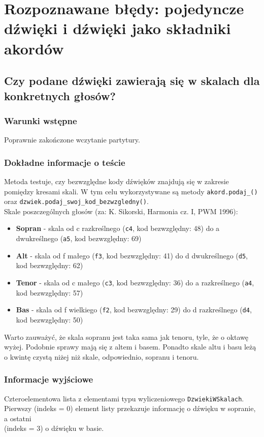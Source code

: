 \documentclass[dokumentacja.tex]{subfiles}
\begin{document}
\section{Rozpoznawane błędy: pojedyncze dźwięki i dźwięki jako składniki akordów}

\subsection{Czy podane dźwięki zawierają się w skalach dla konkretnych głosów?}
\subsubsection{Warunki wstępne}
Poprawnie zakończone wczytanie partytury.
\subsubsection{Dokładne informacje o teście}
Metoda testuje, czy bezwzględne kody dźwięków znajdują się w zakresie pomiędzy kresami skali. W tym celu wykorzystywane są metody \texttt{akord.podaj\_<żądany głos>()} oraz \texttt{dzwiek.podaj\_swoj\_kod\_bezwzgledny()}. \\ Skale poszczególnych głosów (za: K. Sikorski, Harmonia cz. I, PWM 1996):
\begin{itemize}
    \item \textbf{Sopran} - skala od c razkreślnego (\texttt{c4}, kod bezwzględny: 48) do a dwukreślnego (\texttt{a5}, kod bezwzględny: 69)
    \item \textbf{Alt} - skala od f małego (\texttt{f3}, kod bezwzględny: 41) do d dwukreślnego (\texttt{d5}, kod bezwzględny: 62) 
    \item \textbf{Tenor} - skala od c małego (\texttt{c3}, kod bezwzględny: 36) do a razkreślnego (\texttt{a4}, kod bezwzględny: 57)
    \item \textbf{Bas} - skala od f wielkiego (\texttt{f2}, kod bezwzględny: 29) do d razkreślnego (\texttt{d4}, kod bezwzględny: 50)
\end{itemize}
Warto zauważyć, że skala sopranu jest taka sama jak tenoru, tyle, że o oktawę wyżej. Podobnie sprawy mają się z altem i basem. Ponadto skale altu i basu leżą o kwintę czystą niżej niż skale, odpowiednio, sopranu i tenoru.

\subsubsection{Informacje wyjściowe}
Czteroelementowa lista z elementami typu wyliczeniowego  \texttt{DzwiekiWSkalach}.\\ Pierwszy (indeks = 0) element listy przekazuje informację o dźwięku w sopranie, a ostatni \\(indeks = 3) o dźwięku w basie.
\end{document}
